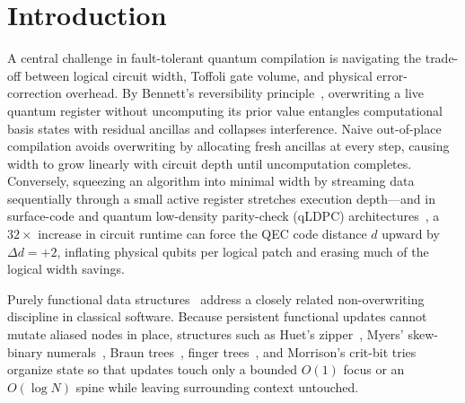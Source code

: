 \documentclass[acmsmall,screen,anonymous]{acmart}
\DeclareRobustCommand{\_}{\ifmmode\text{\char95}\else\char95\penalty0\relax\fi}
\theoremstyle{plain}
\newcommand{\LakefillQ}{\textsc{LakefillQ}}
\begin{document}
\begin{abstract}
Across 60 compiled benchmarks, \LakefillQ{} establishes new Pareto frontiers on open problems: 256-bit elliptic-curve discrete logarithms in 1,088 logical qubits and $14.34 \times 10^6$ Toffolis; RSA-2048 factoring in 1,364 logical qubits without incurring the $\Delta d = +2$ code-distance penalty of sequential carry rippling; a $10.46\times$ width reduction (to 9,984 qubits) for coherent Decoded Quantum Interferometry (DQI), extended to non-binary Hermitian, Suzuki, and lifted bivariate algebraic-geometry codes exceeding Reed--Solomon blocklength bounds; and a $22.48\times$ state-preparation Toffoli reduction for FeMoCo tensor-hypercontracted QSVT. All metatheory, data-structure invariants, and lowering passes are mechanized in 2,492 Lean~4.35.0 theorems across 91 modules with zero axioms or incomplete proofs.
\end{abstract}

\maketitle

\section{Introduction}
\label{sec:intro}

A central challenge in fault-tolerant quantum compilation is navigating the trade-off between logical circuit width, Toffoli gate volume, and physical error-correction overhead. By Bennett's reversibility principle~\cite{bennett1973}, overwriting a live quantum register without uncomputing its prior value entangles computational basis states with residual ancillas and collapses interference. Naive out-of-place compilation avoids overwriting by allocating fresh ancillas at every step, causing width to grow linearly with circuit depth until uncomputation completes. Conversely, squeezing an algorithm into minimal width by streaming data sequentially through a small active register stretches execution depth---and in surface-code and quantum low-density parity-check (qLDPC) architectures~\cite{litinski2019,bravyi2024}, a $32\times$ increase in circuit runtime can force the QEC code distance $d$ upward by $\Delta d = +2$, inflating physical qubits per logical patch and erasing much of the logical width savings.

Purely functional data structures~\cite{braun1983,myers1983,huet1997,okasaki1998,hinze2006} address a closely related non-overwriting discipline in classical software. Because persistent functional updates cannot mutate aliased nodes in place, structures such as Huet's zipper~\cite{huet1997}, Myers' skew-binary numerals~\cite{myers1983}, Braun trees~\cite{braun1983,okasaki1997}, finger trees~\cite{hinze2006}, and Morrison's crit-bit tries~\cite{morrison1968} organize state so that updates touch only a bounded $O(1)$ focus or an $O(\log N)$ spine while leaving surrounding context untouched.
\end{document}
